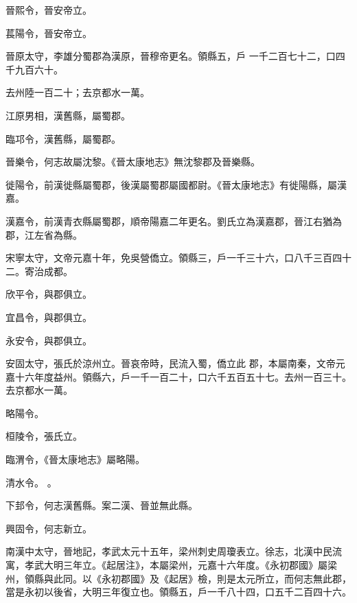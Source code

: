 \begin{pinyinscope}
 晉熙令，晉安帝立。



 萇陽令，晉安帝立。



 晉原太守，李雄分蜀郡為漢原，晉穆帝更名。領縣五，戶
 一千二百七十二，口四千九百六十。



 去州陸一百二十；去京都水一萬。



 江原男相，漢舊縣，屬蜀郡。



 臨邛令，漢舊縣，屬蜀郡。



 晉樂令，何志故屬沈黎。《晉太康地志》無沈黎郡及晉樂縣。



 徙陽令，前漢徙縣屬蜀郡，後漢屬蜀郡屬國都尉。《晉太康地志》有徙陽縣，屬漢嘉。



 漢嘉令，前漢青衣縣屬蜀郡，順帝陽嘉二年更名。劉氏立為漢嘉郡，晉江右猶為郡，江左省為縣。



 宋寧太守，文帝元嘉十年，免吳營僑立。領縣三，戶一千三十六，口八千三百四十二。寄治成都。



 欣平令，與郡俱立。



 宜昌令，與郡俱立。



 永安令，與郡俱立。



 安固太守，張氏於涼州立。晉哀帝時，民流入蜀，僑立此
 郡，本屬南秦，文帝元嘉十六年度益州。領縣六，戶一千一百二十，口六千五百五十七。去州一百三十。去京都水一萬。


略陽令。



 桓陵令，張氏立。



 臨渭令，《晉太康地志》屬略陽。


清水令。
 。



 下邽令，何志漢舊縣。案二漢、晉並無此縣。



 興固令，何志新立。



 南漢中太守，晉地記，孝武太元十五年，梁州刺史周瓊表立。徐志，北漢中民流寓，孝武大明三年立。《起居注》，本屬梁州，元嘉十六年度。《永初郡國》屬梁州，領縣與此同。以《永初郡國》及《起居》檢，則是太元所立，而何志無此郡，當是永初以後省，大明三年復立也。領縣五，戶一千八十四，口五千二百四十六。




\end{pinyinscope}
